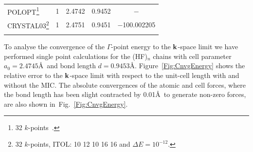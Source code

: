 \documentclass[prl,twocolumn,showpacs,twocolumngrid,superbib]{revtex4}
\begin{document}
\begin{table}[t]
\begin{tabular}{lrllc}
%
    \hline
    {\sc POLOPT}\footnote[2]{32 $k$-points~\cite{DJacquemin99B}.} 
    & 1 & 2.4742 & 0.9452  & $-$\\
    {\sc CRYSTAL03}\footnote[3]{32 $k$-points, ITOL: 10 12 10 16 16 and $\Delta E=10^{-12}$.}
    & 1 & 2.4751 & 0.9451 & $-$100.002205\\
    \botrule
  \end{tabular}
\end{table}

To analyse the convergence of the $\Gamma$-point energy to the ${\bf k}$-space limit
we have performed single point calculations for the 
(HF)$_n$ chains with cell parameter $a_0=2.4745$\AA~and bond length $d=0.9453$\AA.
Figure~\ref{Fig:CnvgEnergy} shows the relative error to the ${\bf k}$-space limit
with respect to the unit-cell length with and without the MIC.
The absolute convergences of the atomic and cell forces, where
the bond length has been slight contracted by 0.01\AA~to generate 
non-zero forces, are also shown in~Fig.~\ref{Fig:CnvgEnergy}.
\end{document}
